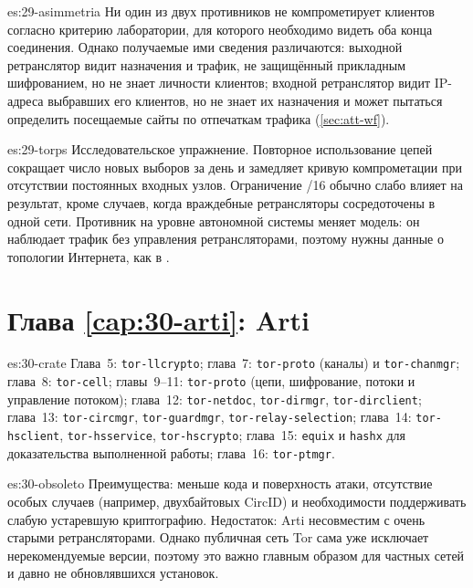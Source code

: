 \begin{soluzione}{es:29-asimmetria}
Ни один из двух противников не компрометирует клиентов согласно критерию лаборатории, для которого необходимо видеть оба конца соединения. Однако получаемые ими сведения различаются: выходной ретранслятор видит назначения и трафик, не защищённый прикладным шифрованием, но не знает личности клиентов; входной ретранслятор видит IP-адреса выбравших его клиентов, но не знает их назначения и может пытаться определить посещаемые сайты по отпечаткам трафика (\cref{sec:att-wf}).
\end{soluzione}

\begin{soluzione}{es:29-torps}
Исследовательское упражнение. Повторное использование цепей сокращает число новых выборов за день и замедляет кривую компрометации при отсутствии постоянных входных узлов. Ограничение /16 обычно слабо влияет на результат, кроме случаев, когда враждебные ретрансляторы сосредоточены в одной сети. Противник на уровне автономной системы меняет модель: он наблюдает трафик без управления ретрансляторами, поэтому нужны данные о топологии Интернета, как в \cite{johnson2013users}.
\end{soluzione}

\section*{Глава \ref{cap:30-arti}: Arti}

\begin{soluzione}{es:30-crate}
Глава~5: \texttt{tor-llcrypto}; глава~7: \texttt{tor-proto} (каналы) и \texttt{tor-chanmgr}; глава~8: \texttt{tor-cell}; главы~9--11: \texttt{tor-proto} (цепи, шифрование, потоки и управление потоком); глава~12: \texttt{tor-netdoc}, \texttt{tor-dirmgr}, \texttt{tor-dirclient}; глава~13: \texttt{tor-circmgr}, \texttt{tor-guardmgr}, \texttt{tor-relay-selection}; глава~14: \texttt{tor-hsclient}, \texttt{tor-hsservice}, \texttt{tor-hscrypto}; глава~15: \texttt{equix} и \texttt{hashx} для доказательства выполненной работы; глава~16: \texttt{tor-ptmgr}.
\end{soluzione}

\begin{soluzione}{es:30-obsoleto}
Преимущества: меньше кода и поверхность атаки, отсутствие особых случаев (например, двухбайтовых CircID) и необходимости поддерживать слабую устаревшую криптографию. Недостаток: Arti несовместим с очень старыми ретрансляторами. Однако публичная сеть Tor сама уже исключает нерекомендуемые версии, поэтому это важно главным образом для частных сетей и давно не обновлявшихся установок.
\end{soluzione}

